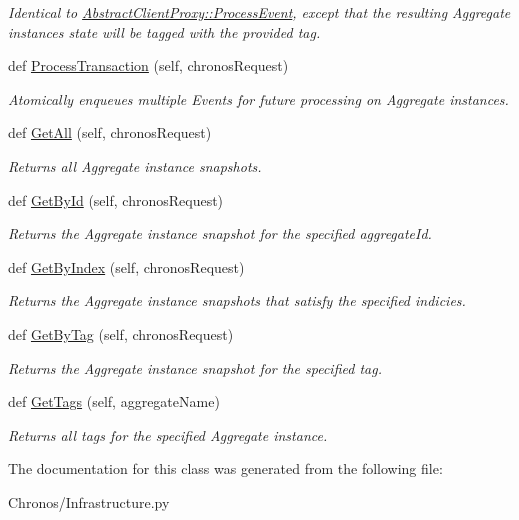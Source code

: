 \begin{DoxyCompactItemize}
\begin{DoxyCompactList}\small\item\em Identical to \hyperlink{group__Chronos_gacc2169d49a6cf3a6947b6362adce3669}{Abstract\+Client\+Proxy\+::\+Process\+Event}, except that the resulting Aggregate instance\textquotesingle{}s state will be tagged with the provided tag. \end{DoxyCompactList}\item 
def \hyperlink{group__Chronos_ga008afdc8115dff35614c7d68a40fb411}{Process\+Transaction} (self, chronos\+Request)
\begin{DoxyCompactList}\small\item\em Atomically enqueues multiple Events for future processing on Aggregate instances. \end{DoxyCompactList}\item 
def \hyperlink{group__Chronos_ga3df0cb678abe0f8ffbcbf691ad8c1b31}{Get\+All} (self, chronos\+Request)
\begin{DoxyCompactList}\small\item\em Returns all Aggregate instance snapshots. \end{DoxyCompactList}\item 
def \hyperlink{group__Chronos_ga086cc33a41671e67f00f4424397753ed}{Get\+By\+Id} (self, chronos\+Request)
\begin{DoxyCompactList}\small\item\em Returns the Aggregate instance snapshot for the specified aggregate\+Id. \end{DoxyCompactList}\item 
def \hyperlink{group__Chronos_ga27d06ec274dfeed3590002c4dcb74c55}{Get\+By\+Index} (self, chronos\+Request)
\begin{DoxyCompactList}\small\item\em Returns the Aggregate instance snapshots that satisfy the specified indicies. \end{DoxyCompactList}\item 
def \hyperlink{group__Chronos_ga540c48883317067ab1f56212487ba1a2}{Get\+By\+Tag} (self, chronos\+Request)
\begin{DoxyCompactList}\small\item\em Returns the Aggregate instance snapshot for the specified tag. \end{DoxyCompactList}\item 
def \hyperlink{group__Chronos_gab81f0f1ed3d38772056236c66a99cb25}{Get\+Tags} (self, aggregate\+Name)
\begin{DoxyCompactList}\small\item\em Returns all tags for the specified Aggregate instance. \end{DoxyCompactList}\end{DoxyCompactItemize}


The documentation for this class was generated from the following file\+:\begin{DoxyCompactItemize}
\item 
Chronos/Infrastructure.\+py\end{DoxyCompactItemize}
